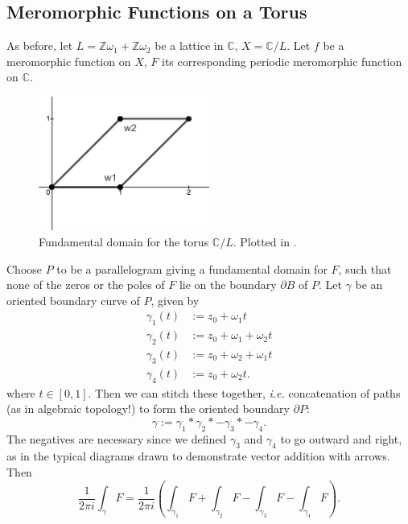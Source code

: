 \documentclass[12pt]{article}
\newcommand{\z}{\mathbb{Z}}
\newcommand{\cx}{\mathbb{C}}
\newcommand{\ita}[1]{\textit{#1}}
\theoremstyle{definition}
\theoremstyle{remark}
\begin{document}
\subsection{Meromorphic Functions on a Torus}
As before, let $L = \z \omega_1 + \z \omega_2$ be a lattice in $\cx$, $X = \cx / L$. Let $f$ be a meromorphic function on $X$, $F$ its corresponding periodic meromorphic function on $\cx$.
\begin{figure}[H]
    \centering
    \includegraphics[width = 0.5\textwidth]{11.png}
    \caption{Fundamental domain for the torus $\cx / L$. Plotted in \cite{Desmos}.}
    \label{fig:Fig11}
\end{figure}
Choose $P$ to be a parallelogram giving a fundamental domain for $F$, such that none of the zeros or the poles of $F$ lie on the boundary $\partial B$ of $P$. Let $\gamma$ be an oriented boundary curve of $P$, given by
\begin{equation}
    \begin{split}
        \gamma_1(t) & := z_0 + \omega_1 t \\
        \gamma_2(t) & := z_0 + \omega_1 + \omega_2 t \\
        \gamma_3(t) & := z_0 + \omega_2 + \omega_1 t \\ 
        \gamma_4(t) & := z_0 + \omega_2 t.
    \end{split}
\end{equation}
where $t \in [0,1]$. Then we can stitch these together, \ita{i.e.} concatenation of paths (as in algebraic topology!) to form the oriented boundary $\partial P$:
\begin{equation}
    \gamma := \gamma_1 \ast \gamma_2 \ast -\gamma_3 \ast -\gamma_4.
\end{equation}
The negatives are necessary since we defined $\gamma_3$ and $\gamma_4$ to go outward and right, as in the typical diagrams drawn to demonstrate vector addition with arrows. Then 
\begin{equation}
    \frac{1}{2 \pi i} \int_{\gamma} 
    F = \frac{1}{2 \pi i} \left( \int_{\gamma_1} F + \int_{\gamma_2} F - \int_{\gamma_3} F - \int_{\gamma_4} F \right).
\end{equation}
\end{document}
